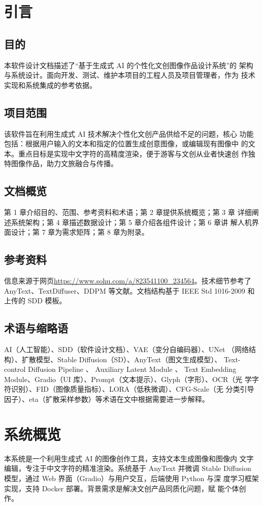 \documentclass[a4paper,12pt]{article}
\begin{document}

\makecover

\tableofcontents
\clearpage

\section{引言}
\subsection{目的}
本软件设计文档描述了“基于生成式 AI 的个性化文创图像作品设计系统”的
架构与系统设计。面向开发、测试、维护本项目的工程人员及项目管理者，作为
技术实现和系统集成的参考依据。
\subsection{项目范围}
该软件旨在利用生成式 AI 技术解决个性化文创产品供给不足的问题，核心
功能包括：根据用户输入的文本和指定的位置生成创意图像，或编辑现有图像中
的文本。重点目标是实现中文字符的高精度渲染，便于游客与文创从业者快速创
作独特图像作品，助力文旅融合与传播。
\subsection{文档概览}
第 1 章介绍目的、范围、参考资料和术语；第 2 章提供系统概览；第 3 章
详细阐述系统架构；第 4 章描述数据设计；第 5 章介绍各组件设计；第 6 章讲
解人机界面设计；第 7 章为需求矩阵；第 8 章为附录。
\subsection{参考资料}
信息来源于网页\url{https://www.sohu.com/a/823541100_234564}。技术细节参考了
AnyText、TextDiffuser、DDPM 等文献。文档结构基于 IEEE Std 1016-2009 和
上传的 SDD 模板。
\subsection{术语与缩略语}
AI（人工智能）、SDD（软件设计文档）、VAE（变分自编码器）、UNet
（网络结构）、扩散模型、Stable Diffusion（SD）、AnyText（图文生成模型）、
Text-control Diffusion Pipeline 、 Auxiliary Latent Module 、 Text Embedding
Module、Gradio（UI 库）、Prompt（文本提示）、Glyph（字形）、OCR（光
学字符识别）、FID（图像质量指标）、LORA（低秩微调）、CFG-Scale（无
分类引导因子）、eta（扩散采样参数）等术语在文中根据需要进一步解释。

\section{系统概览}
本系统是一个利用生成式 AI 的图像创作工具，支持文本生成图像和图像内
文字编辑，专注于中文字符的精准渲染。系统基于 AnyText 并微调 Stable
Diffusion 模型，通过 Web 界面（Gradio）与用户交互，后端使用 Python 与深
度学习框架实现，支持 Docker 部署。背景需求是解决文创产品同质化问题，赋
能个体创作。
\end{document}
